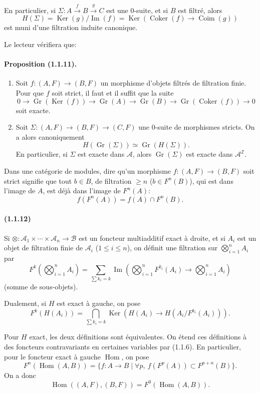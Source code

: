 \documentclass[10pt]{article}
\newcommand{\Z}{\mathbb Z}
\newcommand{\Gr}{\operatorname{Gr}}
\newcommand{\Ker}{\operatorname{Ker}}
\newcommand{\Coker}{\operatorname{Coker}}
\newcommand{\Coim}{\operatorname{Coim}}
\newcommand{\Imop}{\operatorname{Im}}
\newcommand{\Hom}{\operatorname{Hom}}
\newcommand{\calA}{\mathcal A}
\newcommand{\calB}{\mathcal B}
\begin{document}
En particulier, si $\Sigma:A\xrightarrow{f}B\xrightarrow{g}C$ est une $0$-suite, et si $B$ est filtré, alors
\[
H(\Sigma)=\Ker(g)/\Imop(f)=\Ker(\Coker(f)\to\Coim(g))
\]
est muni d'une filtration induite canonique.

Le lecteur vérifiera que:

\paragraph{Proposition (1.1.11).} \begin{enumerate}[label=(\roman*)]
\item Soit $f:(A,F)\to(B,F)$ un morphisme d'objets filtrés de filtration finie. Pour que $f$ soit strict, il faut et il suffit que la suite
\[
0\to\Gr(\Ker(f))\to\Gr(A)\to\Gr(B)\to\Gr(\Coker(f))\to0
\]
soit exacte.
\item Soit $\Sigma:(A,F)\to(B,F)\to(C,F)$ une $0$-suite de morphismes stricts. On a alors canoniquement
\[
H(\Gr(\Sigma))\simeq\Gr(H(\Sigma)).
\]
En particulier, si $\Sigma$ est exacte dans $\calA$, alors $\Gr(\Sigma)$ est exacte dans $\calA^{\Z}$.
\end{enumerate}

Dans une catégorie de modules, dire qu'un morphisme $f:(A,F)\to(B,F)$ soit strict signifie que tout $b\in B$, de filtration $\ge n$ ($b\in F^n(B)$), qui est dans l'image de $A$, est déjà dans l'image de $F^n(A)$:
\[
f(F^n(A))=f(A)\cap F^n(B).
\]

\paragraph{(1.1.12)} Si $\otimes:\calA_1\times\cdots\times\calA_n\to\calB$ est un foncteur multiadditif exact à droite, et si $A_i$ est un objet de filtration finie de $\calA_i$ ($1\le i\le n$), on définit une filtration sur $\bigotimes_{i=1}^nA_i$ par
\[
F^k\left(\bigotimes_{i=1}^n A_i\right)=\sum_{\sum k_i=k}\Imop\left(\bigotimes_{i=1}^n F^{k_i}(A_i)\to\bigotimes_{i=1}^n A_i\right)
\]
(somme de sous-objets).

Dualement, si $H$ est exact à gauche, on pose
\[
F^k(H(A_i))=\bigcap_{\sum k_i=k}\Ker\left(H(A_i)\to H(A_i/F^{k_i}(A_i))\right).
\]

Pour $H$ exact, les deux définitions sont équivalentes. On étend ces définitions à des foncteurs contravariants en certaines variables par (1.1.6). En particulier, pour le foncteur exact à gauche $\Hom$, on pose
\[
F^n(\Hom(A,B))=\{f:A\to B\mid \forall p,\ f(F^p(A))\subset F^{p+n}(B)\}.
\]
On a donc
\[
\Hom((A,F),(B,F))=F^0(\Hom(A,B)).
\]
\end{document}
